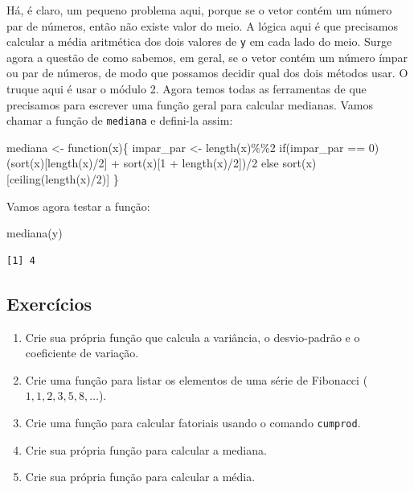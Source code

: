 \documentclass[
  letterpaper,
  DIV=11,
  numbers=noendperiod]{scrreprt}
\newenvironment{Shaded}{\begin{snugshade}}{\end{snugshade}}
\newcommand{\ControlFlowTok}[1]{\textcolor[rgb]{0.00,0.23,0.31}{#1}}
\newcommand{\DecValTok}[1]{\textcolor[rgb]{0.68,0.00,0.00}{#1}}
\newcommand{\FunctionTok}[1]{\textcolor[rgb]{0.28,0.35,0.67}{#1}}
\newcommand{\NormalTok}[1]{\textcolor[rgb]{0.00,0.23,0.31}{#1}}
\newcommand{\OtherTok}[1]{\textcolor[rgb]{0.00,0.23,0.31}{#1}}
\newcommand{\SpecialCharTok}[1]{\textcolor[rgb]{0.37,0.37,0.37}{#1}}
\begin{document}
Há, é claro, um pequeno problema aqui, porque se o vetor contém um
número par de números, então não existe valor do meio. A lógica aqui é
que precisamos calcular a média aritmética dos dois valores de
\texttt{y} em cada lado do meio. Surge agora a questão de como sabemos,
em geral, se o vetor contém um número ímpar ou par de números, de modo
que possamos decidir qual dos dois métodos usar. O truque aqui é usar o
módulo 2. Agora temos todas as ferramentas de que precisamos para
escrever uma função geral para calcular medianas. Vamos chamar a função
de \texttt{mediana} e defini-la assim:

\begin{Shaded}
\begin{Highlighting}[]
\NormalTok{mediana }\OtherTok{\textless{}{-}} \ControlFlowTok{function}\NormalTok{(x)\{}
\NormalTok{  impar\_par }\OtherTok{\textless{}{-}} \FunctionTok{length}\NormalTok{(x)}\SpecialCharTok{\%\%}\DecValTok{2}
  \ControlFlowTok{if}\NormalTok{(impar\_par }\SpecialCharTok{==} \DecValTok{0}\NormalTok{) (}\FunctionTok{sort}\NormalTok{(x)[}\FunctionTok{length}\NormalTok{(x)}\SpecialCharTok{/}\DecValTok{2}\NormalTok{] }\SpecialCharTok{+} \FunctionTok{sort}\NormalTok{(x)[}\DecValTok{1} \SpecialCharTok{+} \FunctionTok{length}\NormalTok{(x)}\SpecialCharTok{/}\DecValTok{2}\NormalTok{])}\SpecialCharTok{/}\DecValTok{2}
  \ControlFlowTok{else} \FunctionTok{sort}\NormalTok{(x)[}\FunctionTok{ceiling}\NormalTok{(}\FunctionTok{length}\NormalTok{(x)}\SpecialCharTok{/}\DecValTok{2}\NormalTok{)]}
\NormalTok{\}}
\end{Highlighting}
\end{Shaded}

Vamos agora testar a função:

\begin{Shaded}
\begin{Highlighting}[]
\FunctionTok{mediana}\NormalTok{(y)}
\end{Highlighting}
\end{Shaded}

\begin{verbatim}
[1] 4
\end{verbatim}

\subsection*{Exercícios}\label{exercuxedcios-3}

\begin{enumerate}
\def\labelenumi{\arabic{enumi}.}
\item
  Crie sua própria função que calcula a variância, o desvio-padrão e o
  coeficiente de variação.
\item
  Crie uma função para listar os elementos de uma série de Fibonacci
  (\(1, 1, 2, 3, 5, 8, \dots\)).
\item
  Crie uma função para calcular fatoriais usando o comando
  \texttt{cumprod}.
\item
  Crie sua própria função para calcular a mediana.
\item
  Crie sua própria função para calcular a média.
\end{enumerate}
\end{document}

